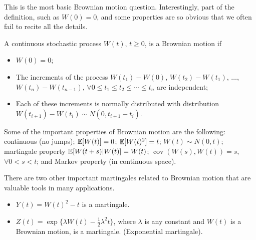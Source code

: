 \begin{solution}
This is the most basic Brownian motion question. Interestingly, part of the definition,
such as $W(0)=0$, and some properties are so obvious that we often fail to recite all the
details.

A continuous stochastic process $W(t)$, $t\geq0$, is a Brownian motion if

\begin{itemize}
\item $W(0)=0$;
\item The increments of the process $W(t_1)-W(0)$, $W(t_2)-W(t_1)$, $\ldots$,
  $W(t_n)-W(t_{n-1})$, $\forall 0\leq t_1\leq t_2\leq\cdots\leq t_n$ are independent;
\item Each of these increments is normally distributed with distribution
  $W(t_{i+1})-W(t_i)\sim N(0,t_{i+1}-t_i)$.
\end{itemize}

Some of the important properties of Brownian motion are the following: continuous (no
jumps); $\mathbb{E}[W(t)]=0$; $\mathbb{E}[W(t)^2]=t$; $W(t)\sim N(0,t)$; martingale property
$\mathbb{E}[W(t+s)\vert W(t)]=W(t)$; $\operatorname{cov}(W(s),W(t))=s$, $\forall 0<s<t$; and
Markov property (in continuous space).

There are two other important martingales related to Brownian motion that are valuable
tools in many applications.

\begin{itemize}
\item $Y(t)=W(t)^2-t$ is a martingale.
\item $Z(t)=\exp\{\lambda W(t)-\frac{1}{2}\lambda^2t\}$, where $\lambda$ is any constant
  and $W(t)$ is a Brownian motion, is a martingale. (Exponential martingale).
\end{itemize}
\end{solution}
